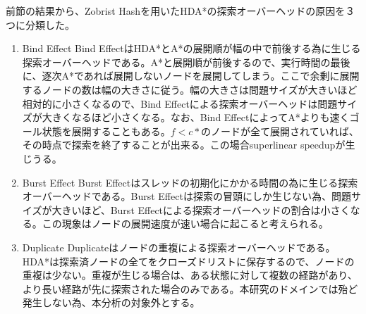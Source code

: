 \documentclass[uplatex]{jsarticle}
\begin{document}
前節の結果から、Zobrist Hashを用いたHDA*の探索オーバーヘッドの原因を３つに分類した。

\begin{enumerate}
\item Bind Effect
\newline
Bind EffectはHDA*とA*の展開順が幅の中で前後する為に生じる探索オーバーヘッドである。A*と展開順が前後するので、実行時間の最後に、逐次A*であれば展開しないノードを展開してしまう。ここで余剰に展開するノードの数は幅の大きさに従う。幅の大きさは問題サイズが大きいほど相対的に小さくなるので、Bind Effectによる探索オーバーヘッドは問題サイズが大きくなるほど小さくなる。なお、Bind EffectによってA*よりも速くゴール状態を展開することもある。$f < c*$のノードが全て展開されていれば、その時点で探索を終了することが出来る。この場合superlinear speedupが生じうる。
\newline

\item Burst Effect
\newline
Burst Effectはスレッドの初期化にかかる時間の為に生じる探索オーバーヘッドである。Burst Effectは探索の冒頭にしか生じない為、問題サイズが大きいほど、Burst Effectによる探索オーバーヘッドの割合は小さくなる。この現象はノードの展開速度が速い場合に起こると考えられる。
\newline

\item Duplicate
\newline
Duplicateはノードの重複による探索オーバーヘッドである。HDA*は探索済ノードの全てをクローズドリストに保存するので、ノードの重複は少ない。重複が生じる場合は、ある状態に対して複数の経路があり、より長い経路が先に探索された場合のみである。本研究のドメインでは殆ど発生しない為、本分析の対象外とする。

\end{enumerate}
\end{document}
